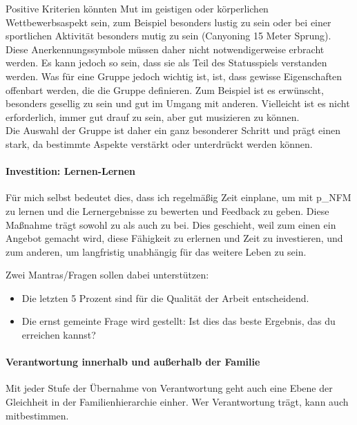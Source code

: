 Positive Kriterien könnten Mut im geistigen oder körperlichen Wettbewerbsaspekt sein, zum Beispiel besonders lustig zu sein oder bei einer sportlichen Aktivität besonders mutig zu sein (Canyoning 15 Meter Sprung).\\

Diese Anerkennungssymbole müssen daher nicht notwendigerweise erbracht werden. Es kann jedoch so sein, dass sie als Teil des Statusspiels verstanden werden. Was für eine Gruppe jedoch wichtig ist, ist, dass gewisse Eigenschaften offenbart werden, die die Gruppe definieren. Zum Beispiel ist es erwünscht, besonders gesellig zu sein und gut im Umgang mit anderen. Vielleicht ist es nicht erforderlich, immer gut drauf zu sein, aber gut musizieren zu können.\\

Die Auswahl der Gruppe ist daher ein ganz besonderer Schritt und prägt einen stark, da bestimmte Aspekte verstärkt oder unterdrückt werden können.

\paragraph{Investition: Lernen-Lernen}

Für mich selbst bedeutet dies, dass ich regelmäßig Zeit einplane, um mit \gls{p_NFM} zu lernen und die Lernergebnisse zu bewerten und Feedback zu geben. Diese Maßnahme trägt sowohl zu \NFMOOne als auch zu \NFMOThree bei. Dies geschieht, weil zum einen ein Angebot gemacht wird, diese Fähigkeit zu erlernen und Zeit zu investieren, und zum anderen, um langfristig unabhängig für das weitere Leben zu sein.

Zwei Mantras/Fragen sollen dabei unterstützen:
\begin{itemize}
	\item Die letzten 5 Prozent sind für die Qualität der Arbeit entscheidend.
	\item Die ernst gemeinte Frage wird gestellt: Ist dies das beste Ergebnis, das du erreichen kannst?
\end{itemize}

\paragraph{Verantwortung innerhalb und außerhalb der Familie}

Mit jeder Stufe der Übernahme von Verantwortung geht auch eine Ebene der Gleichheit in der Familienhierarchie einher. Wer Verantwortung trägt, kann auch mitbestimmen.

